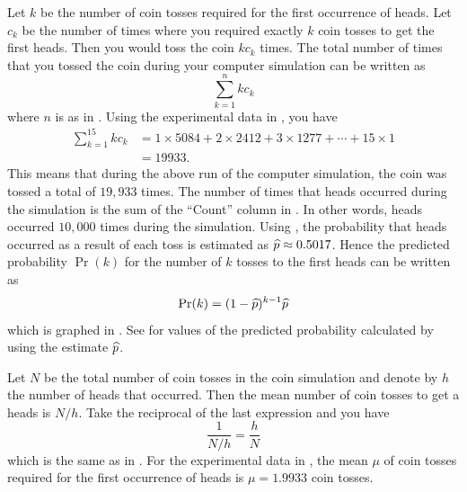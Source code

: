 \documentclass[a4paper,oneside,12pt]{article}
\begin{document}
\begin{problem}
{\begin{solution}
Let $k$ be the number of coin tosses required for the first occurrence
of heads.  Let $c_k$ be the number of times where you required exactly
$k$ coin tosses to get the first heads.  Then you would toss the coin
$k c_k$ times.  The total number of times that you tossed the coin
during your computer simulation can be written as
\[
\sum_{k=1}^n k c_k
\]
where $n$ is as
in .  Using the
experimental data in
, you have
\begin{align*}
\sum_{k=1}^{15} k c_k
&=
1 \times 5084 + 2 \times 2412 + 3 \times 1277 + \cdots
+
15 \times 1 \\[4pt]
&=
19933.
\end{align*}
This means that during the above run of the computer simulation, the
coin was tossed a total of $19,933$ times.  The number of times that
heads occurred during the simulation is the sum of the ``Count''
column in .  In
other words, heads occurred $10,000$ times during the simulation.
Using , the probability that
heads occurred as a result of each toss is estimated as
$\widehat{p} \approx 0.5017$.  Hence the predicted probability $\Pr(k)$ for
the number of $k$ tosses to the first heads can be written as
\begin{equation}
\label{eqn:coin_simulation_predicted_probability}
\Pr(k)
=
(1 - \widehat{p})^{k-1} \widehat{p}
\end{equation}
which is graphed in .
See  for values of
the predicted probability calculated by using the estimate $\widehat{p}$.

Let $N$ be the total number of coin tosses in the coin simulation and
denote by $h$ the number of heads that occurred.  Then the mean number
of coin tosses to get a heads is $N / h$.  Take the reciprocal of the
last expression and you have
\[
\frac{1}{N / h}
=
\frac{h}{N}
\]
which is the same as in .
For the experimental data in
, the mean $\mu$ of
coin tosses required for the first occurrence of heads is
$\mu = 1.9933$ coin tosses.
\end{solution}
}{}
\end{problem}
\end{document}
